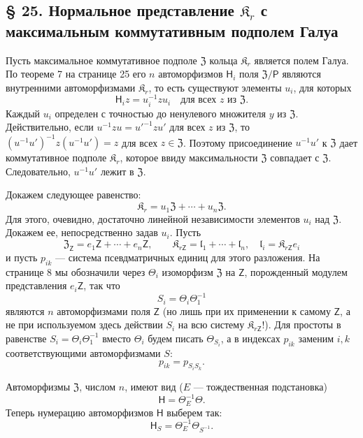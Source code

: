 \documentclass[11pt]{article}
\begin{document}
\subsection*{§ 25. Нормальное представление \(\mathfrak K_r\) с максимальным коммутативным подполем Галуа\protect\footnotemark}
\label{normaldarstellung-von-r_r-mit-galoisschem-maximalem-kommutativem-teilkoerper-1}

Пусть максимальное коммутативное подполе \(\mathfrak Z\) кольца \(\mathfrak K_r\) является полем Галуа. По теореме 7 на странице 25 его \(n\) автоморфизмов \(\mathsf{H}_i\) поля \(\mathfrak Z/\mathsf P\) являются внутренними автоморфизмами \(\mathfrak K_r\), то есть существуют элементы \(u_i\), для которых
\[
\mathsf{H}_i z=u_i^{-1}zu_i\quad\text{для всех }z\text{ из }\mathfrak Z.
\]
Каждый \(u_i\) определен с точностью до ненулевого множителя \(y\) из \(\mathfrak Z\). Действительно, если \(u^{-1}zu=u'^{-1}zu'\) для всех \(z\) из \(\mathfrak Z\), то \((u^{-1}u')^{-1}z(u^{-1}u')=z\) для всех \(z\in\mathfrak Z\). Поэтому присоединение \(u^{-1}u'\) к \(\mathfrak Z\) дает коммутативное подполе \(\mathfrak K_r\), которое ввиду максимальности \(\mathfrak Z\) совпадает с \(\mathfrak Z\). Следовательно, \(u^{-1}u'\) лежит в \(\mathfrak Z\).

Докажем следующее равенство:
\[
\mathfrak K_r=u_1\mathfrak Z+\cdots+u_n\mathfrak Z.
\]
Для этого, очевидно, достаточно линейной независимости элементов \(u_i\) над \(\mathfrak Z\). Докажем ее, непосредственно задав \(u_i\). Пусть
\[
\mathfrak Z_{\mathsf{Z}}=e_1\mathsf{Z}+\cdots+e_n\mathsf{Z},\qquad
\mathfrak K_{r\mathsf{Z}}=\mathfrak l_1+\cdots+\mathfrak l_n,\quad
\mathfrak l_i=\mathfrak K_{r\mathsf{Z}}e_i
\]
и пусть \(p_{ik}\) --- система псевдматричных единиц для этого разложения. На странице 8 мы обозначили через \(\Theta_i\) изоморфизм \(\mathfrak Z\) на \(\mathsf{Z}\), порожденный модулем представления \(e_i\mathsf{Z}\), так что
\[
S_i=\Theta_i\Theta_1^{-1}
\]
являются \(n\) автоморфизмами поля \(\mathsf{Z}\) (но лишь при их применении к самому \(\mathsf{Z}\), а не при используемом здесь действии \(S_i\) на всю систему \(\mathfrak K_{r\mathsf{Z}}\)!). Для простоты в равенстве \(S_i=\Theta_i\Theta_1^{-1}\) вместо \(\Theta_i\) будем писать \(\Theta_{S_i}\), а в индексах \(p_{ik}\) заменим \(i,k\) соответствующими автоморфизмами \(S\):
\[
p_{ik}=p_{S_iS_k}.
\]

Автоморфизмы \(\mathfrak Z\), числом \(n\), имеют вид (\(E\) --- тождественная подстановка)
\[
\mathsf{H}=\Theta_E^{-1}\Theta.
\]
Теперь нумерацию автоморфизмов \(\mathsf{H}\) выберем так:
\[
\mathsf{H}_S=\Theta_E^{-1}\Theta_{S^{-1}}.
\]
\end{document}
